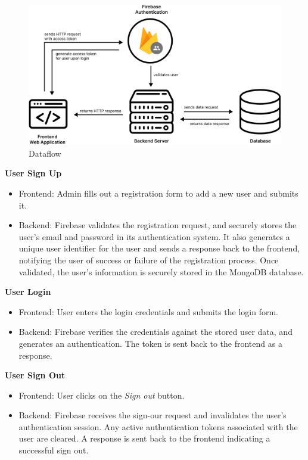 \begin{figure}[h]
\centering
\includegraphics[width=\textwidth]{final-report/assets/dataflow.png}
\caption{Dataflow}
\end{figure}

\textbf{User Sign Up}
\begin{itemize}
    \item Frontend: Admin fills out a registration form to add a new user and submits it.
    \item Backend: Firebase validates the registration request, and securely stores the user’s email and password in its authentication system. It also generates a unique user identifier for the user and sends a response back to the frontend, notifying the user of success or failure of the registration process. Once validated, the user’s information is securely stored in the MongoDB database.
\end{itemize}

\textbf{User Login}
\begin{itemize}
    \item Frontend: User enters the login credentials and submits the login form.
    \item Backend: Firebase verifies the credentials against the stored user data, and generates an authentication. The token is sent back to the frontend as a response.
\end{itemize}

\textbf{User Sign Out}
\begin{itemize}
    \item Frontend: User clicks on the \textit{Sign out} button.
    \item Backend: Firebase receives the sign-our request and invalidates the user’s authentication session. Any active authentication tokens associated with the user are cleared. A response is sent back to the frontend indicating a successful sign out.
\end{itemize}

